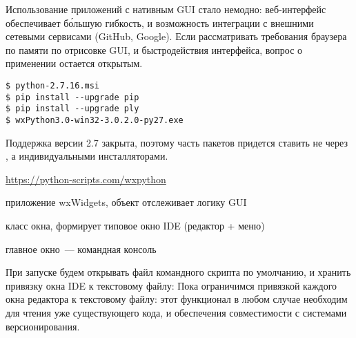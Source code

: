 \label{wx}\secdown

\noindent
Использование приложений с нативным GUI стало немодно: веб-интер\-фейс
обеспечивает б\'{о}льшую гибкость, и возможность
интеграции с внешними сетевыми сервисами (GitHub, Google). Если рассматривать
требования браузера по памяти по отрисовке GUI, и быстродействия интерфейса,
вопрос о применении  остается открытым.


\begin{verbatim}
$ python-2.7.16.msi
$ pip install --upgrade pip
$ pip install --upgrade ply
$ wxPython3.0-win32-3.0.2.0-py27.exe
\end{verbatim}

\noindent
Поддержка версии 2.7 закрыта, поэтому часть пакетов придется ставить не через
, а индивидуальными инсталляторами.


\url{https://python-scripts.com/wxpython}

\clearpage
{}

\begin{description}[nosep]
\item[ide] приложение wxWidgets, объект отслеживает логику GUI
\item[ideWindow] класс окна, формирует типовое окно IDE (редактор + меню)
\item[ideConsole] главное окно\ --- командная консоль
\end{description}



\clearpage
{}

\clearpage
При запуске будем открывать файл командного скрипта по умолчанию, и хранить
привязку окна IDE к текстовому файлу:
Пока ограничимся привязкой каждого окна редактора к текстовому файлу: этот
функционал в любом случае необходим для чтения уже существующего кода, и
обеспечения совместимости с системами версионирования.
\clearpage
{}

